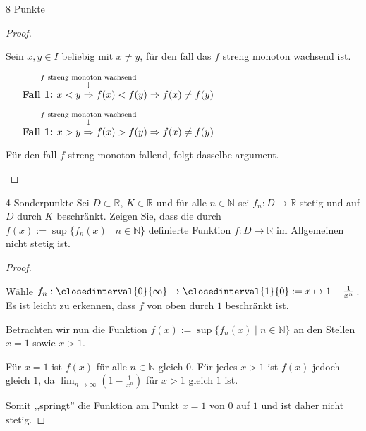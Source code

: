 \documentclass{problemset}
\begin{document}
\begin{problem}{8 Punkte}
\begin{proof}
\begin{itemize}
		      Sein $x,y \in I$ beliebig mit $x \ne y$, für den fall das $f$ streng monoton wachsend ist.

		      \begin{itemize}
			      \item [\textbf{Fall 1:}] $x < y \annotated{$f$ streng monoton wachsend}{\Rightarrow} f(x) < f(y) \Rightarrow f(x) \ne f(y)$ \checkmark
			      \item [\textbf{Fall 1:}] $x > y \annotated{$f$ streng monoton wachsend}{\Rightarrow} f(x) > f(y) \Rightarrow f(x) \ne f(y)$ \checkmark
		      \end{itemize}

		      Für den fall $f$ streng monoton fallend, folgt dasselbe argument.
	\end{itemize}
\end{proof}
\end{problem}

\begin{problem}{4 Sonderpunkte}
Sei $D \subset \mathbb{R}$, $K \in \mathbb{R}$ und für alle $n \in \mathbb{N}$ sei $f_n : D \to \mathbb{R}$ stetig und auf $D$ durch $K$ beschränkt. Zeigen Sie, dass die durch $f(x) := \sup\{f_n(x) \mid n \in \mathbb{N}\}$ definierte Funktion $f : D \to \mathbb{R}$ im Allgemeinen nicht stetig ist.
\begin{proof}
	$ $

	Wähle $f_n: \closedinterval{0}{\infty} \rightarrow \closedinterval{1}{0} := x \mapsto 1 - \frac{1}{x^n}$. Es ist leicht zu erkennen, dass $f$ von oben durch $1$ beschränkt ist.

	Betrachten wir nun die Funktion $f(x) := \sup\{f_n(x) \mid n \in \mathbb{N}\}$ an den Stellen $x = 1$ sowie $x > 1$.

	Für $x = 1$ ist $f(x)$ für alle $n \in \mathbb{N}$ gleich $0$. Für jedes $x > 1$ ist $f(x)$ jedoch gleich $1$, da $\lim_{{n \to \infty}} (1 - \frac{1}{x^n})$ für $x > 1$ gleich $1$ ist.

	Somit ,,springt'' die Funktion am Punkt $x = 1$ von $0$ auf $1$ und ist daher nicht stetig.
\end{proof}
\end{problem}
\end{document}
